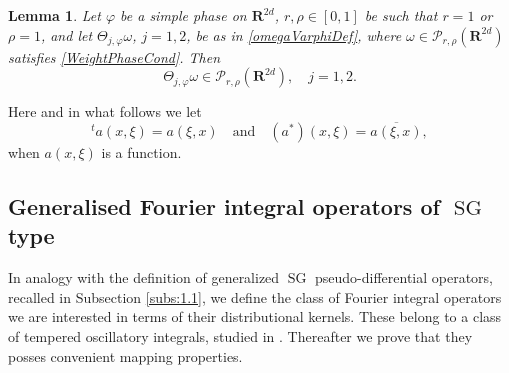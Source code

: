 \documentclass[12pt,a4paper,reqno]{amsart}
\numberwithin{equation}{section}
\numberwithin{thm}{section}
\newtheorem{lemma}[thm]{Lemma}
\theoremstyle{definition}
\theoremstyle{remark}
\begin{document}
\par

\begin{lemma}
Let ${\varphi}$ be a simple phase on ${\mathbf R^{{2d}}}$, $r,\rho \in [0,1]$ be such that
$r=1$ or $\rho =1$, and let $\Theta _{j,{\varphi}}\omega$, $j=1,2$, be as in
\eqref{omegaVarphiDef}, where $\omega \in {\mathscr P}
_{r,\rho}({\mathbf R^{{2d}}})$ satisfies \eqref{WeightPhaseCond}.
Then
\begin{equation*}
	\Theta _{j,{\varphi}}\omega \in {\mathscr P} _{r,\rho}({\mathbf R^{{2d}}}),\quad j=1,2.
\end{equation*}
\end{lemma}

\par

Here and in what follows we let
$$
^{t}a(x,\xi)=a(\xi,x)\quad  \text{and} \quad (a^*)(x,\xi)
=\overline{a(\xi,x)},
$$
when $a(x,\xi)$ is a function.

\par

\subsection{Generalised Fourier integral operators of ${\operatorname{SG}}$
type}\label{subs:2.2}
In analogy with the definition of generalized ${\operatorname{SG}}$
pseudo-differential operators, recalled in Subsection
\ref{subs:1.1}, we define the class of Fourier integral
operators we are interested in terms of their distributional
kernels. These belong to a class of tempered
oscillatory integrals, studied in \cite{CoSch}. Thereafter we
prove that they posses convenient mapping properties.

\par
\end{document}
